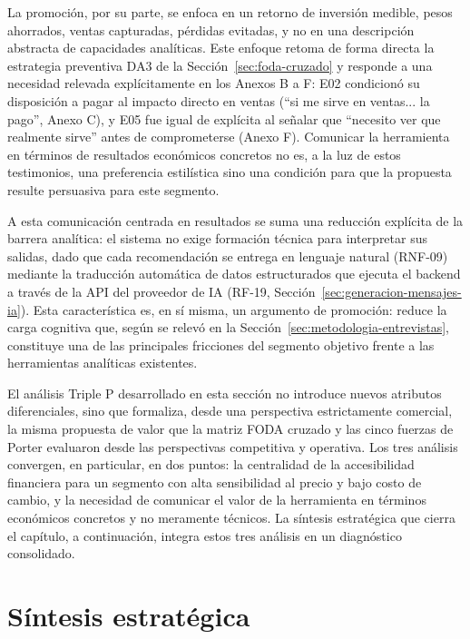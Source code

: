 La promoción, por su parte, se enfoca en un retorno de inversión medible, pesos ahorrados, ventas capturadas, pérdidas evitadas, y no en una descripción abstracta de capacidades analíticas. Este enfoque retoma de forma directa la estrategia preventiva DA3 de la Sección~\ref{sec:foda-cruzado} y responde a una necesidad relevada explícitamente en los Anexos B a F: E02 condicionó su disposición a pagar al impacto directo en ventas (\enquote{si me sirve en ventas... la pago}, Anexo C), y E05 fue igual de explícita al señalar que \enquote{necesito ver que realmente sirve} antes de comprometerse (Anexo F). Comunicar la herramienta en términos de resultados económicos concretos no es, a la luz de estos testimonios, una preferencia estilística sino una condición para que la propuesta resulte persuasiva para este segmento.

A esta comunicación centrada en resultados se suma una reducción explícita de la barrera analítica: el sistema no exige formación técnica para interpretar sus salidas, dado que cada recomendación se entrega en lenguaje natural (RNF-09) mediante la traducción automática de datos estructurados que ejecuta el backend a través de la API del proveedor de IA (RF-19, Sección~\ref{sec:generacion-mensajes-ia}). Esta característica es, en sí misma, un argumento de promoción: reduce la carga cognitiva que, según se relevó en la Sección~\ref{sec:metodologia-entrevistas}, constituye una de las principales fricciones del segmento objetivo frente a las herramientas analíticas existentes.

El análisis Triple P desarrollado en esta sección no introduce nuevos atributos diferenciales, sino que formaliza, desde una perspectiva estrictamente comercial, la misma propuesta de valor que la matriz FODA cruzado y las cinco fuerzas de Porter evaluaron desde las perspectivas competitiva y operativa. Los tres análisis convergen, en particular, en dos puntos: la centralidad de la accesibilidad financiera para un segmento con alta sensibilidad al precio y bajo costo de cambio, y la necesidad de comunicar el valor de la herramienta en términos económicos concretos y no meramente técnicos. La síntesis estratégica que cierra el capítulo, a continuación, integra estos tres análisis en un diagnóstico consolidado.

\section{Síntesis estratégica}
\label{sec:sintesis-estrategica}

